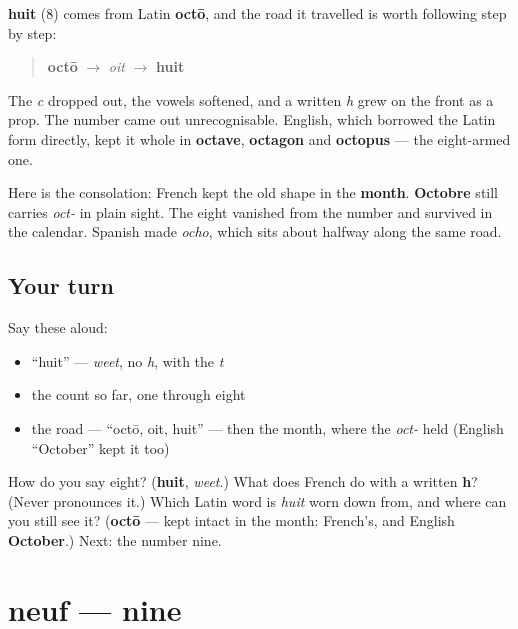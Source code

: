 \begin{cousinweb}
\textbf{huit} (8) comes from Latin \textbf{octō}, and the road it travelled is worth following step by step:

\begin{quote}
\textbf{octō} $\to$ \emph{oit} $\to$ \textbf{huit}
\end{quote}

The \emph{c} dropped out, the vowels softened, and a written \emph{h} grew on the front as a prop. The number came out unrecognisable. English, which borrowed the Latin form directly, kept it whole in \textbf{octave}, \textbf{octagon} and \textbf{octopus} — the eight-armed one.

Here is the consolation: French kept the old shape in the \textbf{month}. \textbf{Octobre} still carries \emph{oct-} in plain sight. The eight vanished from the number and survived in the calendar. Spanish made \emph{ocho}, which sits about halfway along the same road.
\end{cousinweb}

\subsection*{Your turn}
Say these aloud:

\begin{itemize}
\raggedright
  \item \textquotedblleft{}huit\textquotedblright{} — \emph{weet}, no \emph{h}, with the \emph{t}
  \item the count so far, one through eight
  \item the road — \textquotedblleft{}octō, oit, huit\textquotedblright{} — then the month, where the \emph{oct-} held (English \textquotedblleft{}October\textquotedblright{} kept it too)
\end{itemize}

\begin{tcolorbox}[breakable,colback=teal!4,colframe=teal!35!black,title={Before you move on}]
How do you say eight? (\textbf{huit}, \emph{weet}.) What does French do with a written \textbf{h}? (Never pronounces it.) Which Latin word is \emph{huit} worn down from, and where can you still see it? (\textbf{octō} — kept intact in the month: French's, and English \textbf{October}.) Next: the number nine.
\end{tcolorbox}
\section[neuf]{neuf — nine}

